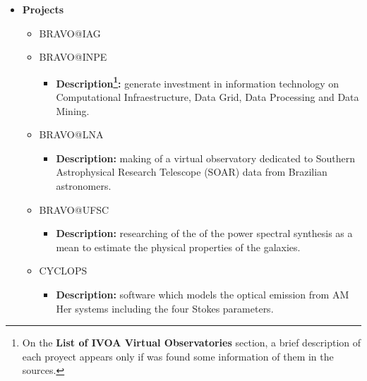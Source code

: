 \documentclass[11pt]{article}
\begin{document}
                \begin{itemize}
                    \item \textbf{Projects}
                        \begin{itemize}
                            \item BRAVO@IAG
                            \item BRAVO@INPE
                                \begin{itemize}
                                    \item \textbf{Description\footnote{On the
\textbf{List of IVOA Virtual Observatories} section, a brief description of each
proyect appears only if was found some information of them in the sources.}:}
generate investment in information technology on Computational Infraestructure,
Data Grid, Data Processing and Data Mining.
                                \end{itemize}
                            \item BRAVO@LNA
                                \begin{itemize}
                                    \item \textbf{Description:} making of a
virtual observatory dedicated to Southern Astrophysical Research Telescope
(SOAR) data from Brazilian astronomers.  \end{itemize}
                            \item BRAVO@UFSC
                                \begin{itemize}
                                    \item \textbf{Description:} researching of
the of the power spectral synthesis as a mean to estimate the physical
properties of the galaxies.
                                \end{itemize}
                            \item CYCLOPS
                                \begin{itemize}
                                    \item \textbf{Description:} software which
models the optical emission from AM Her systems including the four Stokes
parameters.
                                \end{itemize}
                        \end{itemize}
                \end{itemize}
\end{document}

